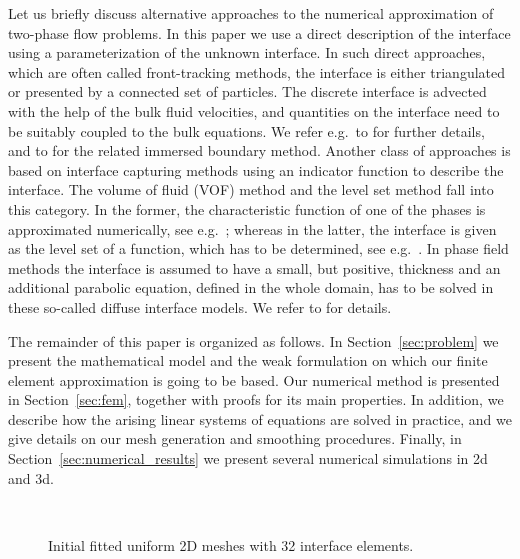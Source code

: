 \documentclass[a4paper,12pt,onecolumn]{article}
\begin{document}
Let us briefly discuss alternative approaches to the numerical approximation of
two-phase flow problems. In this paper we use a direct description of the
interface using a parameterization of the unknown interface. In such direct
approaches, which are often called front-tracking methods, the interface is
either triangulated or presented by a connected set of particles. The discrete
interface is advected with the help of the bulk fluid velocities, and quantities
on the interface need to be suitably coupled to the bulk equations. We refer
e.g.\ to
\cite{UnverdiT92,Bansch01,Tryggvason_etal01,GanesanMT07,GanesanT08,spurious}
for further details, and to \cite{LevequeL97,Peskin02} for the related immersed
boundary method. Another class of approaches is based on interface capturing
methods using an indicator function to describe the interface. The volume of
fluid (VOF) method and the level set  method fall into this category. In the
former, the characteristic function of one of the phases is approximated
numerically, see e.g.\ \cite{HirtN81,RenardyR02,Popinet09}; whereas in the
latter, the interface is given as the level set of a function, which has to be
determined, see e.g.\ \cite{SussmanSO94,Sethian99,OsherF03,GrossR07}. In phase
field methods the interface is assumed to have a small, but positive, thickness
and an additional parabolic equation, defined in the whole domain, has to be
solved in these so-called diffuse interface models. We refer to
\cite{HohenbergH77,AndersonMW98,LowengrubT98,Feng06,KaySW08,AbelsGG12,GrunK14}
for details.

The remainder of this paper is organized as follows. In
Section~\ref{sec:problem} we present the mathematical model and the weak
formulation on which our finite element approximation is going to be based. Our
numerical method is presented in Section~\ref{sec:fem}, together with proofs for
its main properties. In addition, we describe how the arising linear systems of
equations are solved in practice, and we give details on our mesh generation and
smoothing procedures. Finally, in Section~\ref{sec:numerical_results} we present
several numerical simulations in 2d and 3d.

\begin{figure}[htbp]
  \centering
  \quad
  \\
  \caption{Initial fitted uniform 2D meshes with 32 interface elements.}
  \label{fig:meshes_uniform}
\end{figure}
\end{document}
